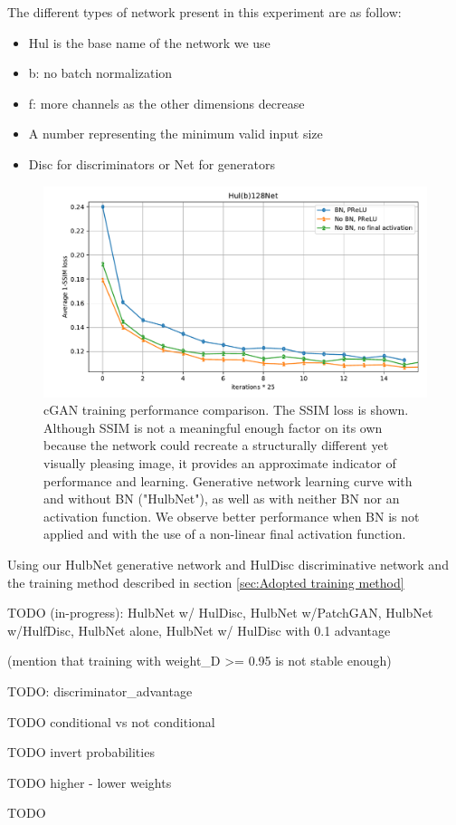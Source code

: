 The different types of network present in this experiment are as follow:
\begin{itemize}
  \item Hul is the base name of the network we use
  \item b: no batch normalization
  \item f: more channels as the other dimensions decrease
  \item A number representing the minimum valid input size
  \item Disc for discriminators or Net for generators
\end{itemize}

\begin{figure}[!htbp]
\centering
\includegraphics[width=1\linewidth]{gfx/graphs/gen-BN.pdf}
\caption[cGAN training performance comparison]{
cGAN training performance comparison. The \acs{SSIM} loss is shown. Although \acs{SSIM} is not a meaningful enough factor on its own because the network could recreate a structurally different yet visually pleasing image, it provides an approximate indicator of performance and learning. 
Generative network learning curve with and without \acl{BN} ("HulbNet"), as well as with neither \ac{BN} nor an activation function. We observe better performance when \acl{BN} is not applied and with the use of a non-linear final activation function.}
\label{fig:gen-BN}
\end{figure}

Using our HulbNet generative network and HulDisc discriminative network and the training method described in section \ref{sec:Adopted training method}  

TODO (in-progress): HulbNet w/ HulDisc, HulbNet w/PatchGAN, HulbNet w/HulfDisc, HulbNet alone, HulbNet w/ HulDisc with 0.1 advantage

(mention that training with weight\_D >= 0.95 is not stable enough) 

TODO: discriminator\_advantage

TODO conditional vs not conditional

TODO invert probabilities

TODO higher - lower weights

TODO 
